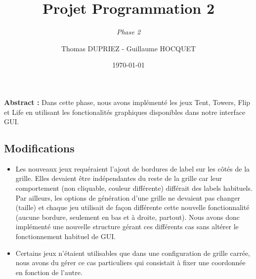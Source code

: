 \documentclass[a4paper]{article}
\title{Projet Programmation 2}
\subtitle{\emph{Phase 2}}
\author{Thomas DUPRIEZ - Guillaume HOCQUET}
\date{\today}
\begin{document}
\maketitle
\textbf{Abstract :} Dans cette phase, nous avons implémenté les jeux Tent, Towers, Flip et Life en utilisant les fonctionalités graphiques disponibles dans notre interface GUI.

\subsection*{Modifications}
\begin{itemize}
\item Les nouveaux jeux requéraient l'ajout de bordures de label sur les côtés de la grille. Elles devaient être indépendantes du reste de la grille car leur comportement (non cliquable, couleur différente) différait des labels habituels. Par ailleurs, les options de génération d'une grille ne devaient pas changer (taille) et chaque jeu utilisait de façon différente cette nouvelle fonctionnalité (aucune bordure, seulement en bas et à droite, partout). Nous avons donc implémenté une nouvelle structure gérant ces différents cas sans altérer le fonctionnement habituel de GUI.
\item Certains jeux n'étaient utilisables que dans une configuration de grille carrée, nous avons du gérer ce cas particuliers qui consistait à fixer une coordonnée en fonction de l'autre.
\end{itemize}
\end{document}
